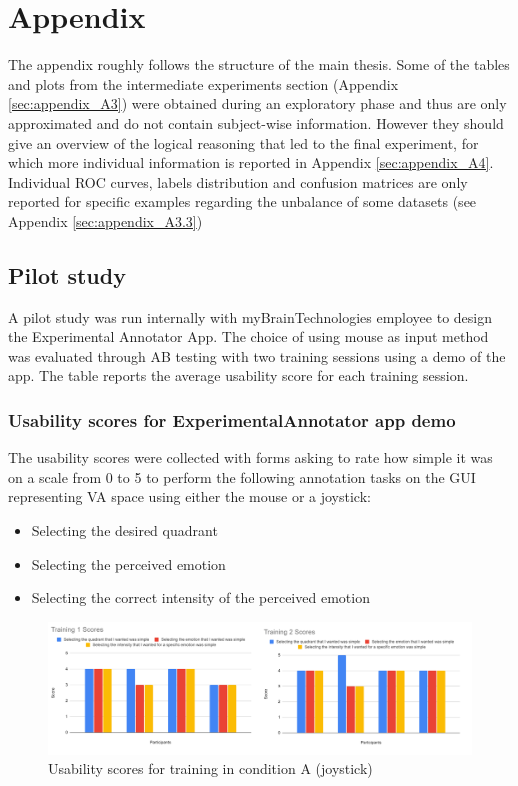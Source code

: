 \chapter{Appendix}
\label{app:appendix_A}
The appendix roughly follows the structure of the main thesis. Some of the tables and plots from the intermediate experiments section (Appendix \ref{sec:appendix_A3}) were obtained during an exploratory phase and thus are only approximated and do not contain subject-wise information. However they should give an overview of the logical reasoning that led to the final experiment, for which more individual information is reported in Appendix \ref{sec:appendix_A4}. Individual ROC curves, labels distribution and confusion matrices are only reported for specific examples regarding the unbalance of some datasets (see Appendix \ref{sec:appendix_A3.3})

\section{Pilot study}
\label{sec:appendix_A1}
A pilot study was run internally with myBrainTechnologies employee to design the Experimental Annotator App. The choice of using mouse as input method was evaluated through A\text{\textbar}B testing with two training sessions using a demo of the app. The table reports the average usability score for each training session.

\subsection{Usability scores for ExperimentalAnnotator app demo}
\label{sec:appendix_A1.1}
The usability scores were collected with forms asking to rate how simple it was on a scale from 0 to 5 to perform the following annotation tasks on the GUI representing \ac{VA} space using either the mouse or a joystick:
\begin{itemize}
\item Selecting the desired quadrant 
\item Selecting the perceived emotion
\item Selecting the correct intensity of the perceived emotion
\end{itemize}


\begin{figure}[!htb]
\includegraphics[width=16cm]{img/appendix/usability_condition_A.png}
\centering
\caption{Usability scores for training in condition A (joystick)}\label{fig:usability_condition_A}
\end{figure}

